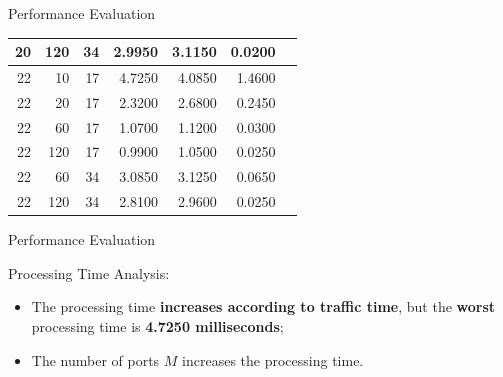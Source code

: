 \documentclass[newPxFont, numfooter, sectionpages]{beamer}
\begin{document}
\begin{frame}{Performance Evaluation}
\begin{table}[!t]
\begin{tabular}{|r|r|r|r|r|r|r|}
			20	& 120	& 34	& 2.9950	& 3.1150	& 0.0200\\ \hline
			22	& 10	& 17	& 4.7250	& 4.0850	& 1.4600\\ \hline
			22	& 20	& 17	& 2.3200	& 2.6800	& 0.2450\\ \hline
			22	& 60	& 17	& 1.0700	& 1.1200	& 0.0300\\ \hline
			22	& 120	& 17	& 0.9900	& 1.0500	& 0.0250\\ \hline
			22	& 60	& 34	& 3.0850	& 3.1250	& 0.0650\\ \hline
			22	& 120	& 34	& 2.8100	& 2.9600	& 0.0250\\ \hline
		\end{tabular}
	\end{table}
	
\end{frame}
\begin{frame}{Performance Evaluation}

	Processing Time Analysis:
	\begin{itemize}
		\item The processing time \textbf{increases according to traffic time}, but the \textbf{worst} processing time is \textbf{4.7250 milliseconds};
		\item The number of ports $M$ increases the processing time.
	\end{itemize}
	
\end{frame}


\end{document}
